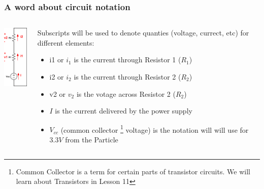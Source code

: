 \documentclass{beamer}
\begin{document}
\begin{frame}\frametitle{A word about circuit notation}
\begin{columns}
\begin{column}{2.5cm}
\begin{center}
\includegraphics[width=1.5cm]{fig/notation.png}
\end{center}
\end{column}
\begin{column}{8.5cm}
Subscripts will be used to denote quanties (voltage, currect, etc) for different elements:
\begin{itemize}
\item i1 or $i_1$ is the current through Resistor 1 ($R_1$) 
\item i2 or $i_2$ is the current through Resistor 2 ($R_2$) 
\item v2 or $v_2$ is the votage across Resistor 2 ($R_2$) 
\item $I$ is the current delivered by the power supply
\item $V_{cc}$ (common collector \footnote{Common Collector is a term for certain parts of transistor circuits. We will learn about Transistors in Lesson 11} voltage) is the notation will will use for $3.3V$ from the Particle
\end{itemize}
\end{column}
\end{columns}
\end{frame}
\end{document}
